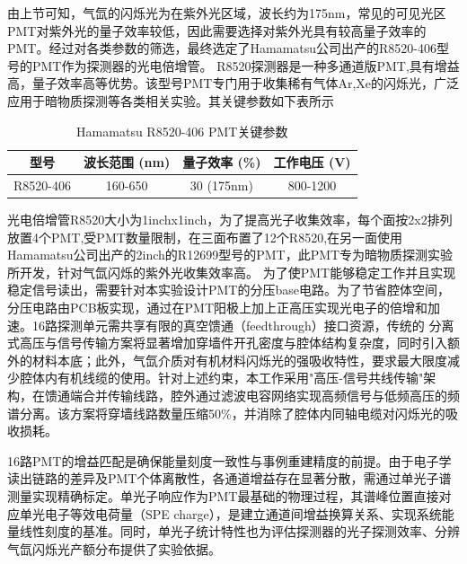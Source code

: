 由上节可知，气氙的闪烁光为在紫外光区域，波长约为175nm，常见的可见光区PMT对紫外光的量子效率较低，因此需要选择对紫外光具有较高量子效率的PMT。经过对各类参数的筛选，最终选定了Hamamatsu公司出产的R8520-406型号的PMT作为探测器的光电倍增管。
R8520探测器是一种多通道版PMT,具有增益高，量子效率高等优势。该型号PMT专门用于收集稀有气体Ar,Xe的闪烁光，广泛应用于暗物质探测等各类相关实验。其关键参数如下表所示
\begin{table}[htbp]
    \centering
    \begin{tabular}{cccc}
        \hline
        型号 & 波长范围 (nm) & 量子效率 (\%) & 工作电压 (V) \\
        \hline
        R8520-406 & 160-650 & 30 (175nm) & 800-1200 \\
        \hline
    \end{tabular}
    \caption{Hamamatsu R8520-406 PMT关键参数}
    \label{tab:PMT}
\end{table}

光电倍增管R8520大小为1inchx1inch，为了提高光子收集效率，每个面按2x2排列放置4个PMT,受PMT数量限制，在三面布置了12个R8520,在另一面使用Hamamatsu公司出产的2inch的R12699型号的PMT，此PMT专为暗物质探测实验所开发，针对气氙闪烁的紫外光收集效率高。
为了使PMT能够稳定工作并且实现稳定信号读出，需要针对本实验设计PMT的分压base电路。为了节省腔体空间，分压电路由PCB板实现，通过在PMT阳极上加上正高压实现光电子的倍增和加速。16路探测单元需共享有限的真空馈通（feedthrough）接口资源，传统的 分离式高压与信号传输方案将显著增加穿墙件开孔密度与腔体结构复杂度，同时引入额外的材料本底；此外，气氙介质对有机材料闪烁光的强吸收特性，要求最大限度减少腔体内有机线缆的使用。针对上述约束，本工作采用"高压-信号共线传输"架构，在馈通端合并传输线路，腔外通过滤波电容网络实现高频信号与低频高压的频谱分离。该方案将穿墙线路数量压缩50\%，并消除了腔体内同轴电缆对闪烁光的吸收损耗。    

16路PMT的增益匹配是确保能量刻度一致性与事例重建精度的前提。由于电子学读出链路的差异及PMT个体离散性，各通道增益存在显著分散，需通过单光子谱测量实现精确标定。单光子响应作为PMT最基础的物理过程，其谱峰位置直接对应单光电子等效电荷量（SPE charge），是建立通道间增益换算关系、实现系统能量线性刻度的基准。同时，单光子统计特性也为评估探测器的光子探测效率、分辨气氙闪烁光产额分布提供了实验依据。


